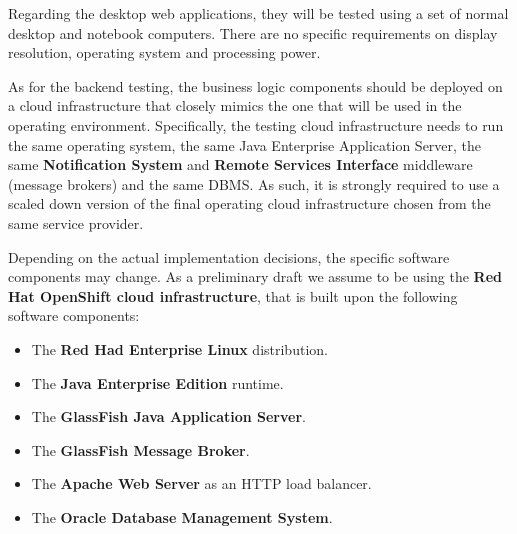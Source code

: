 Regarding the desktop web applications, they will be tested using a set of normal desktop and notebook computers. There are no specific requirements on display resolution, operating system and processing power.

As for the backend testing, the business logic components should be deployed on a cloud infrastructure that closely mimics the one that will be used in the operating environment. 
Specifically, the testing cloud infrastructure needs to run the same operating system, the same Java Enterprise Application Server, the same \textbf{Notification System} and \textbf{Remote Services Interface} middleware (message brokers) and the same DBMS.
As such, it is strongly required to use a scaled down version of the final operating cloud infrastructure chosen from the same service provider. 

Depending on the actual implementation decisions, the specific software components may change. As a preliminary draft we assume to be using the \textbf{Red Hat OpenShift cloud infrastructure}, that is built upon the following software components:
\begin{itemize}
	\item The \textbf{Red Had Enterprise Linux} distribution.
	\item The \textbf{Java Enterprise Edition} runtime.
	\item The \textbf{GlassFish Java Application Server}.
	\item The \textbf{GlassFish Message Broker}.
	\item The \textbf{Apache Web Server} as an HTTP load balancer.
	\item The \textbf{Oracle Database Management System}.
\end{itemize}

